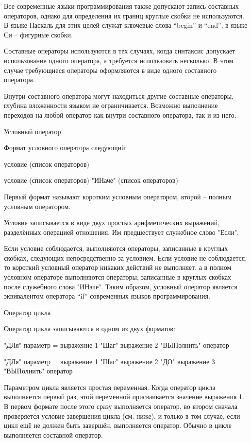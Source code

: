 \documentclass[11pt]{article}
\begin{document}
Все современные языки
программирования также допускают
запись составных операторов, однако
для определения их границ круглые
скобки не используются. В языке Паскаль
для этих целей служат ключевые слова
“begin” и “end”, в языке Си – фигурные
скобки.

Составные операторы используются в тех
случаях, когда синтаксис допускает
использование одного оператора, а
требуется использовать несколько. В
этом случае требующиеся операторы
оформляются в виде одного составного
оператора.

Внутри составного оператора могут
находиться другие составные операторы,
глубина вложенности языком не
ограничивается. Возможно выполнение
переходов на любой оператор как внутри
составного оператора, так и из него.

Условный оператор

Формат условного оператора следующий:

условие (список операторов)

условие (список операторов) "ИНаче"
(список операторов)

Первый формат называют коротким
условным оператором, второй – полным
условным оператором.

Условие записывается в виде двух
простых арифметических выражений,
разделённых операцией отношения. Им
предшествует служебное слово "Если".

Если условие соблюдается, выполняются
операторы, записанные в круглых
скобках, следующих непосредственно за
условием. Если условие не соблюдается,
то короткий условный оператор никаких
действий не выполняет, а в полном
условном операторе выполняются
операторы, записанные в круглых
скобках после служебного слова "ИНаче".
Таким образом, условный оператор
является эквивалентом оператора “if”
современных языков программирования.

Оператор цикла

Оператор цикла записываются в одном из
двух форматов:

"ДЛя" параметр = выражение 1 "Шаг"
выражение 2 "ВЫПолнить" оператор

"ДЛя" параметр = выражение 1 "Шаг"
выражение 2 "ДО" выражение 3 "ВЫПолнить"
оператор

Параметром цикла является простая
переменная. Когда оператор цикла
выполняется первый раз, этой
переменной присваивается значение
выражения 1. В первом формате после
этого сразу выполняется оператор, во
втором сначала проверяется условие
завершения цикла (см. ниже), и только в
том случае, если цикл ещё не должен быть
завершён, выполняется оператор. Обычно
в цикле выполняется составной
оператор.
\end{document}
